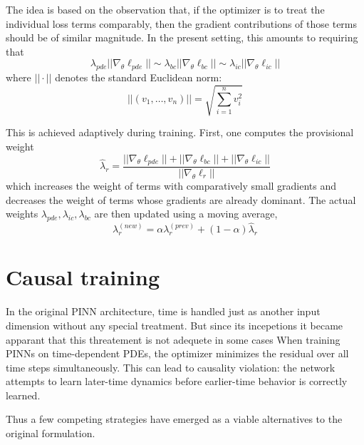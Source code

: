 The idea is based on the observation that, if the optimizer is to treat the individual loss terms comparably, then the gradient contributions of those terms should be of similar magnitude.
In the present setting, this amounts to requiring that
$$
\lambda_{pde}
||\nabla_\theta\ell_{pde}||
\sim
\lambda_{bc}
||\nabla_\theta\ell_{bc}||
\sim
\lambda_{ic}
||\nabla_\theta\ell_{ic}||
$$
where $||\cdot||$ denotes the standard Euclidean norm:
$$
||(v_1,\dots,v_n)|| = \sqrt{\sum_{i=1}^n v_i^2}
$$

This is achieved adaptively during training.
First, one computes the provisional weight
$$
\hat\lambda_{r} = 
\frac{
||\nabla_\theta\ell_{pde}||
+||\nabla_\theta\ell_{bc}||
+||\nabla_\theta\ell_{ic}||
}{
||\nabla_\theta\ell_{r}||
}
$$
which increases the weight of terms with comparatively small gradients and decreases the weight of terms whose gradients are already dominant.
The actual weights $\lambda_{pde}, \lambda_{ic}, \lambda_{bc}$ are then updated using a moving average,
$$
\lambda_r^{(new)} =
\alpha \lambda_r^{(prev)}
+ (1-\alpha) \hat\lambda_r
$$



\section{Causal training}

In the original PINN architecture, time is handled just as another input dimension without any special treatment.
But since its incepetions it became apparant that this threatement is not adequete in some cases
When training PINNs on time-dependent PDEs, the optimizer minimizes the residual over all time steps simultaneously.
This can lead to causality violation: the network attempts to learn later-time dynamics before earlier-time behavior is correctly learned.
\cite{causal_pinns}

Thus a few competing strategies have emerged as a viable alternatives to the original formulation.


